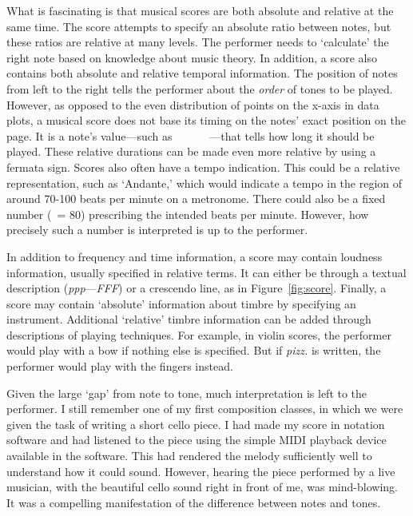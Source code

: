 What is fascinating is that musical scores are both absolute and relative at the same time. The score attempts to specify an absolute ratio between notes, but these ratios are relative at many levels. The performer needs to `calculate' the right note based on knowledge about music theory. In addition, a score also contains both absolute and relative temporal information. The position of notes from left to the right tells the performer about the \emph{order} of tones to be played. However, as opposed to the even distribution of points on the x-axis in data plots, a musical score does not base its timing on the notes' exact position on the page. It is a note's value---such as \musWhole\ \musHalf\ \musQuarter\ \musEighth\ \musWholeDotted\ \musHalfDotted\ \musQuarterDotted---that tells how long it should be played. These relative durations can be made even more relative by using a fermata sign.
Scores also often have a tempo indication. This could be a relative representation, such as `Andante,' which would indicate a tempo in the region of around 70-100 beats per minute on a metronome. There could also be a fixed number (\musQuarter\ = 80) prescribing the intended beats per minute. However, how precisely such a number is interpreted is up to the performer.

In addition to frequency and time information, a score may contain loudness information, usually specified in relative terms. It can either be through a textual description (\emph{ppp}---\emph{FFF}) or a crescendo line, as in Figure~\ref{fig:score}. Finally, a score may contain `absolute' information about timbre by specifying an instrument. Additional `relative' timbre information can be added through descriptions of playing techniques. For example, in violin scores, the performer would play with a bow if nothing else is specified. But if \emph{pizz.} is written, the performer would play with the fingers instead.

Given the large `gap' from note to tone, much interpretation is left to the performer. I still remember one of my first composition classes, in which we were given the task of writing a short cello piece. I had made my score in notation software and had listened to the piece using the simple MIDI playback device available in the software. This had rendered the melody sufficiently well to understand how it could sound. However, hearing the piece performed by a live musician, with the beautiful cello sound right in front of me, was mind-blowing. It was a compelling manifestation of the difference between notes and tones.

